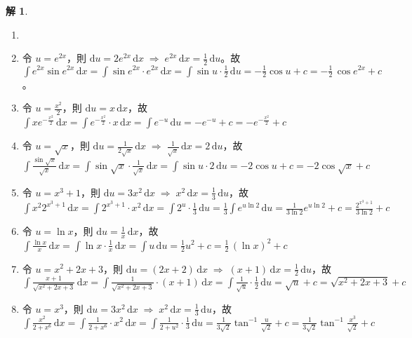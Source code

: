 \documentclass[12pt]{extarticle}
\newcommand{\ds}{\displaystyle}
\newcommand{\ie}{\;\Longrightarrow\;}
\theoremstyle{definition}
\newtheorem*{sol}{解}
\begin{document}
\begin{sol}
  \begin{enumerate}\setlength{\itemsep}{0pt}
    \item[]
    \item 令 $u = e^{2x}$，則 $\ds\text{d}u = 2e^{2x}\,\text{d}x\ie e^{2x}\,\text{d}x = \frac{1}{2}\,\text{d}u$。故 $\ds\int e^{2x}\sin{e^{2x}}\,\mathrm{d}x = \int\!\sin{e^{2x}}\cdot e^{2x}\,\text{d}x = \int\!\sin u\cdot\frac{1}{2}\,\text{d}u = -\frac{1}{2}\cos u + c = -\frac{1}{2}\,\cos{e^{2x}} + c$。
    \item 令 $\ds u = \frac{x^2}{2}$，則 $\ds\text{d}u = x\,\text{d}x$，故 $\ds\int x e^{-\frac{x^2}{2}}\,\mathrm{d}x = \int e^{-\frac{x^2}{2}}\cdot x\,\mathrm{d}x = \int e^{-u}\,\text{d}u = -e^{-u} + c = -e^{-\frac{x^2}{2}} + c$
    \item 令 $\ds u = \sqrt{x}$，則 $\ds\text{d}u = \frac{1}{2\sqrt{x}}\,\text{d}x\ie \frac{1}{\sqrt{x}}\,\text{d}x = 2\,\text{d}u$，故 $\ds\int\!\frac{\sin{\sqrt{x}}}{\sqrt{x}}\,\mathrm{d}x = \int\!\sin{\sqrt{x}}\cdot\frac{1}{\sqrt{x}}\,\text{d}x = \int\!\sin u\cdot 2\,\text{d}u = -2\cos u + c = -2\cos{\sqrt{x}} + c$
    \item 令 $\ds u = x^3 + 1$，則 $\ds\text{d} u = 3 x^2\,\text{d}x\ie x^2\,\text{d}x = \frac{1}{3}\,\text{d}u$，故 $\ds\int x^2 2^{x^3 + 1}\,\mathrm{d}x = \int 2^{x^3 + 1}\cdot x^2\,\text{d}x = \int 2^u\cdot\frac{1}{3}\,\text{d}u = \frac{1}{3}\int e^{u\ln 2}\,\text{d}u = \frac{1}{3\ln 2}e^{u\ln 2} + c = \frac{2^{x^3 + 1}}{3\ln 2} + c$
    \item 令 $\ds u = \ln x$，則 $\ds\text{d} u = \frac{1}{x}\,\text{d}x$，故 $\ds\int\!\frac{\ln x}{x}\,\mathrm{d}x = \int\!\ln x\cdot\frac{1}{x}\,\text{d}x = \int u\,\text{d}u = \frac{1}{2} u^2 + c = \frac{1}{2}\,(\ln x)^2 + c$
    \item 令 $\ds u = x^2 + 2x + 3$，則 $\ds\text{d} u = (2 x + 2)\,\text{d}x\ie (x + 1)\,\text{d}x = \frac{1}{2}\,\text{d}u$，故 $\ds\int\!\frac{x + 1}{\sqrt{x^2 + 2x + 3}}\,\mathrm{d}x = \int\!\frac{1}{\sqrt{x^2 + 2x + 3}}\cdot(x + 1)\,\text{d}x = \int\!\frac{1}{\sqrt{u}}\cdot\frac{1}{2}\,\text{d}u = \sqrt{u} + c = \sqrt{x^2 + 2x + 3} + c$
    \item 令 $\ds u = x^3$，則 $\ds\text{d} u = 3x^2\,\text{d}x\ie x^2\,\text{d}x = \frac{1}{3}\,\text{d}u$，故 $\ds\int\!\frac{x^2}{2 + x^6}\,\mathrm{d}x = \int\!\frac{1}{2 + x^6}\cdot x^2\,\text{d}x = \int\!\frac{1}{2 + u^2}\cdot\frac{1}{3}\,\text{d}u = \frac{1}{3\sqrt{2}}\tan^{-1}\frac{u}{\sqrt{2}} + c = \frac{1}{3\sqrt{2}}\tan^{-1}{\frac{x^3}{\sqrt{2}}} + c$

\end{enumerate}
\end{sol}
\end{document}
